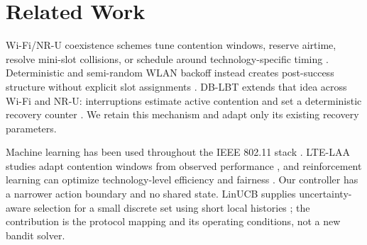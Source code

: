 \section{Related Work}
\label{sec:related}

Wi-Fi/NR-U coexistence schemes tune contention windows, reserve airtime,
resolve mini-slot collisions, or schedule around technology-specific timing
\cite{naik2020next,saha2021survey,kosek2021downlink}. Deterministic and
semi-random WLAN backoff instead creates post-success structure without
explicit slot assignments \cite{he2013semirandom,sanabria2017higheff}.
DB-LBT extends that idea across Wi-Fi and NR-U: interruptions estimate active
contention and set a deterministic recovery counter
\cite{kosek2022dblbt,tinnirello2026deterministic}. We retain this mechanism and
adapt only its existing recovery parameters.

Machine learning has been used throughout the IEEE 802.11 stack
\cite{szott2022wifiml}. LTE-LAA studies adapt contention windows from observed
performance \cite{ali2017ml}, and reinforcement learning can optimize
technology-level efficiency and fairness \cite{han2020rl}. Our controller has
a narrower action boundary and no shared state. LinUCB supplies uncertainty-aware
selection for a small discrete set using short local histories
\cite{li2010linucb}; the contribution is the protocol mapping and its operating
conditions, not a new bandit solver.
